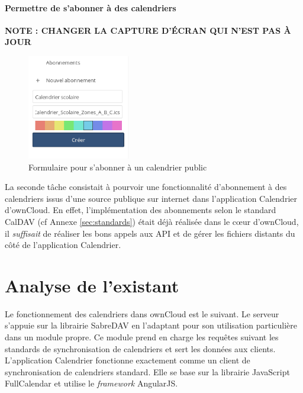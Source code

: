 \documentclass[10pt,a4paper, twoside]{report}
\begin{document}
	\subsubsection{Permettre de s'abonner à des calendriers}
	
	\textbf{\color{red}NOTE : CHANGER LA CAPTURE D'ÉCRAN QUI N'EST PAS À JOUR}
	
	\begin{figure}
		\begin{center}
			\includegraphics[width=0.40\textwidth]{images/creation_abonnement.png}
		\end{center}
		\caption{Formulaire pour s'abonner à un calendrier public}
		\label{abonnement-calendrier}
	\end{figure}
	
	La seconde tâche consistait à pourvoir une fonctionnalité d'abonnement à des calendriers issus d'une source publique sur internet dans l'application Calendrier d'ownCloud. En effet, l'implémentation des abonnements selon le standard CalDAV (cf Annexe \ref{sec:standards}) était déjà réalisée dans le cœur d'ownCloud, il \textit{suffisait} de réaliser les bons appels aux API et de gérer les fichiers distants du côté de l'application Calendrier.	
	
	\chapter{Analyse de l'existant}
	
	Le fonctionnement des calendriers dans ownCloud est le suivant. Le serveur s'appuie sur la librairie SabreDAV en l'adaptant pour son utilisation particulière dans un module propre. Ce module prend en charge les requêtes suivant les standards de synchronisation de calendriers et sert les données aux clients.
	\\
	
	L'application Calendrier fonctionne exactement comme un client de synchronisation de calendriers standard. Elle se base sur la librairie JavaScript FullCalendar et utilise le \textit{framework} AngularJS.
	
\end{document}
